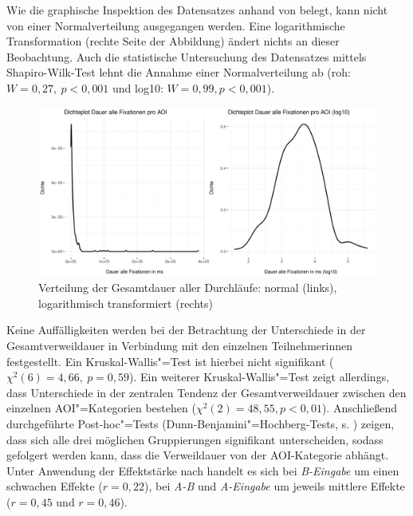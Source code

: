 
Wie die graphische Inspektion des Datensatzes anhand von  belegt, kann nicht von einer Normalverteilung ausgegangen werden. Eine logarithmische Transformation (rechte Seite der Abbildung) ändert nichts an dieser Beobachtung. Auch die statistische Untersuchung des Datensatzes mittels Shapiro-Wilk-Test lehnt die Annahme einer Normalverteilung ab (roh: $W = 0,27,\allowbreak\ p < 0,001$ und log10: $W = 0,99, p < 0,001$).


\begin{figure}
    \includegraphics[width=\textwidth]{Figures/EyeTracking/DD/ggplot_DD-Dwell_density_de}
	\caption{Verteilung der Gesamtdauer aller Durchläufe: normal (links), 
             logarithmisch transformiert (rechts)\label{K6:fig:DD:density-Dwell}}
\end{figure}


Keine Auffälligkeiten werden bei der Betrachtung der Unterschiede in der Gesamtverweildauer in Verbindung mit den einzelnen Teilnehmer{\textperiodcentered}innen festgestellt. Ein Kruskal-Wallis"=Test ist hierbei nicht signifikant ($\chi^2(6) = 4,66,\allowbreak\ p = 0,59$). Ein weiterer Kruskal-Wallis"=Test zeigt allerdings, dass Unterschiede in der zentralen Tendenz der Gesamtverweildauer zwischen den einzelnen AOI"=Kategorien bestehen ($\chi^2(2) = 48,55, p < 0,01$). Anschließend durchgeführte Post-hoc"=Tests (Dunn-Benjamini"=Hochberg-Tests, s. ) zeigen, dass sich alle drei möglichen Gruppierungen signifikant unterscheiden, sodass gefolgert werden kann, dass die Verweildauer von der AOI-Kategorie abhängt. Unter Anwendung der Effektstärke nach \citet{cohen_power_1992} handelt es sich bei \emph{B-Eingabe} um einen schwachen Effekte ($r = 0,22$), bei \emph{A-B} und \emph{A-Eingabe} um jeweils mittlere Effekte ($r = 0,45$ und $r = 0,46$).

